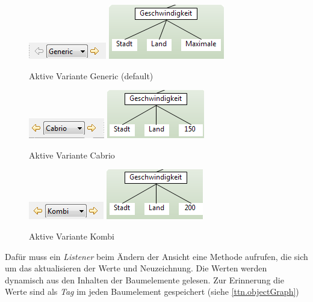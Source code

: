 \begin{figure}[h!]
  \begin{center}
    \includegraphics{4_2_Change_Var_Generic.png}
    \includegraphics[scale=0.8]{4_2_Change_Var_Generic_Tree.png}
  		  \caption{Aktive Variante Generic (default)}
     \label{ttn.generic}
  \end{center}
\end{figure}

\begin{figure}[h!]
  \begin{center}
    \includegraphics{4_2_Change_Var_Cabrio.png}
    \includegraphics[scale=0.9]{4_2_Change_Var_Cabrio_Tree.png}
  		  \caption{Aktive Variante Cabrio}
     \label{ttn.2}
  \end{center}
\end{figure}

\begin{figure}[h!]
  \begin{center}
    \includegraphics{4_2_Change_Var_Kombi.png}
    \includegraphics[scale=0.9]{4_2_Change_Var_Kombi_Tree.png}
  		  \caption{Aktive Variante Kombi}
     \label{ttn.3}
  \end{center}
\end{figure}

Dafür muss ein \textit{Listener} beim Ändern der Ansicht eine Methode aufrufen, die sich um das aktualisieren der Werte und Neuzeichnung. Die Werten werden dynamisch aus den Inhalten der Baumelemente gelesen. Zur Erinnerung die Werte sind als \textit{Tag} im jeden Baumelement gespeichert (siehe \ref{ttn.objectGraph})


